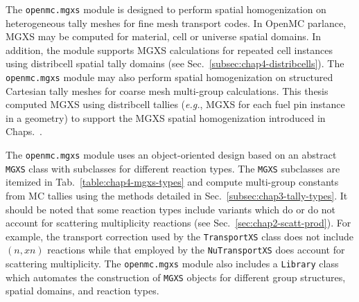 The \texttt{openmc.mgxs} module is designed to perform spatial homogenization on heterogeneous tally meshes for fine mesh transport codes. In OpenMC parlance, \ac{MGXS} may be computed for material, cell or universe spatial domains. In addition, the module supports \ac{MGXS} calculations for repeated cell instances using distribcell spatial tally domains (see Sec.~\ref{subsec:chap4-distribcells}). The \texttt{openmc.mgxs} module may also perform spatial homogenization on structured Cartesian tally meshes for coarse mesh multi-group calculations. This thesis computed \ac{MGXS} using distribcell tallies (\textit{e.g.}, \ac{MGXS} for each fuel pin instance in a geometry) to support the \ac{MGXS} spatial homogenization introduced in Chaps.~.

The \texttt{openmc.mgxs} module uses an object-oriented design based on an abstract \texttt{MGXS} class with subclasses for different reaction types. The \texttt{MGXS} subclasses are itemized in Tab.~\ref{table:chap4-mgxs-types} and compute multi-group constants from \ac{MC} tallies using the methods detailed in Sec.~\ref{subsec:chap3-tally-types}. It should be noted that some reaction types include variants which do or do not account for scattering multiplicity reactions (see Sec.~\ref{sec:chap2-scatt-prod}). For example, the transport correction used by the \texttt{TransportXS} class does not include $(n,xn)$ reactions while that employed by the \texttt{NuTransportXS} does account for scattering multiplicity. The \texttt{openmc.mgxs} module also includes a \texttt{Library} class which automates the construction of \texttt{MGXS} objects for different group structures, spatial domains, and reaction types.


